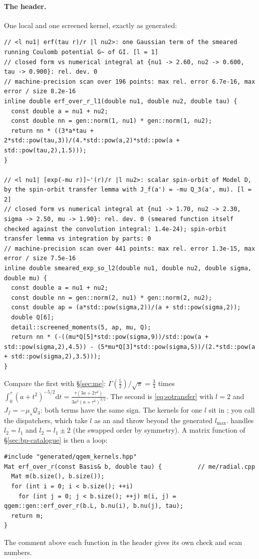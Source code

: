 \documentclass[11pt,a4paper]{article}
\numberwithin{equation}{section}
\theoremstyle{definition}
\theoremstyle{plain}
\theoremstyle{remark}
\numberwithin{algorithm}{section}
\newcommand{\dd}{\mathrm{d}}
\newcommand{\mus}{\mu_s}
\begin{document}
\paragraph{The header.} One local and one screened kernel, exactly as generated:
\begin{lstlisting}[style=cpp]
// <l nu1| erf(tau r)/r |l nu2>: one Gaussian term of the smeared running Coulomb potential G~ of GI. [l = 1]
// closed form vs numerical integral at {nu1 -> 2.60, nu2 -> 0.600, tau -> 0.900}: rel. dev. 0
// machine-precision scan over 196 points: max rel. error 6.7e-16, max error / size 8.2e-16
inline double erf_over_r_l1(double nu1, double nu2, double tau) {
  const double a = nu1 + nu2;
  const double nn = gen::norm(1, nu1) * gen::norm(1, nu2);
  return nn * ((3*a*tau + 2*std::pow(tau,3))/(4.*std::pow(a,2)*std::pow(a + std::pow(tau,2),1.5)));
}

// <l nu1| [exp(-mu r)]~'(r)/r |l nu2>: scalar spin-orbit of Model D, by the spin-orbit transfer lemma with J_f(a') = -mu Q_3(a', mu). [l = 2]
// closed form vs numerical integral at {nu1 -> 1.70, nu2 -> 2.30, sigma -> 2.50, mu -> 1.90}: rel. dev. 0 (smeared function itself checked against the convolution integral: 1.4e-24); spin-orbit transfer lemma vs integration by parts: 0
// machine-precision scan over 441 points: max rel. error 1.3e-15, max error / size 7.5e-16
inline double smeared_exp_so_l2(double nu1, double nu2, double sigma, double mu) {
  const double a = nu1 + nu2;
  const double nn = gen::norm(2, nu1) * gen::norm(2, nu2);
  const double ap = (a*std::pow(sigma,2))/(a + std::pow(sigma,2));
  double Q[6];
  detail::screened_moments(5, ap, mu, Q);
  return nn * (-((mu*Q[5]*std::pow(sigma,9))/std::pow(a + std::pow(sigma,2),4.5)) - (5*mu*Q[3]*std::pow(sigma,5))/(2.*std::pow(a + std::pow(sigma,2),3.5)));
}
\end{lstlisting}
Compare the first with \S\ref{sec:me}: $\Gamma(\frac52)/\sqrt\pi=\frac34$ times $\int_0^\tau(a+t^2)^{-5/2}\dd t=\frac{\tau(3a+2\tau^2)}{3a^2(a+\tau^2)^{3/2}}$. The second is \eqref{eq:sotransfer} with $l=2$ and $J_f=-\mus\mathcal Q_3$: both terms have the same sign.
The kernels for one $l$ sit in ; you call the dispatchers, which take $l$ as an  and throw  beyond the generated $l_{\max}$.  handles $l_2=l_1$ and $l_2=l_1\pm2$ (the swapped order by symmetry). A matrix function of \S\ref{sec:bp-catalogue} is then a loop:
\begin{lstlisting}[style=cpp]
#include "generated/qgem_kernels.hpp"
Mat erf_over_r(const Basis& b, double tau) {          // me/radial.cpp
  Mat m(b.size(), b.size());
  for (int i = 0; i < b.size(); ++i)
    for (int j = 0; j < b.size(); ++j) m(i, j) = qgem::gen::erf_over_r(b.L, b.nu(i), b.nu(j), tau);
  return m;
}
\end{lstlisting}
The comment above each function in the header gives its own check and scan numbers.
\end{document}
